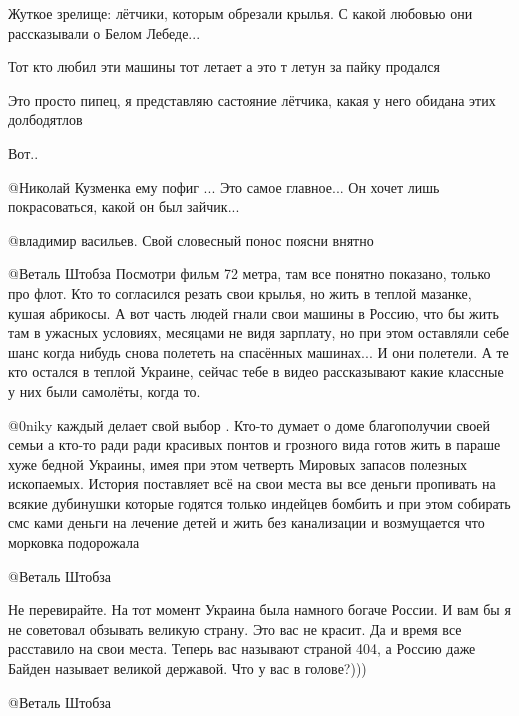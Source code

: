 \begin{itemize}
\begin{multicols}{2}

Жуткое зрелище: лётчики, которым обрезали крылья. С какой любовью они
рассказывали о Белом Лебеде...

\begin{itemize} %

Тот кто любил эти машины тот летает а это т летун за пайку продался


Это просто пипец, я представляю састояние лётчика, какая у него обидана этих долбодятлов

Вот..


@Николай Кузменка  ему пофиг ... Это самое главное... Он хочет лишь
покрасоваться, какой он был зайчик...

@владимир васильев. Свой словесный понос поясни внятно


@Веталь Штобза  Посмотри фильм 72 метра, там все понятно показано, только про
флот. Кто то согласился резать свои крылья, но жить в теплой мазанке, кушая
абрикосы. А вот часть людей гнали свои машины в Россию, что бы жить там в
ужасных условиях, месяцами не видя зарплату, но при этом оставляли себе шанс
когда нибудь снова полететь на спасённых машинах... И они полетели. А те кто
остался в теплой Украине, сейчас тебе в видео рассказывают какие классные у
них были самолёты, когда то.


@0niky   каждый делает свой выбор . Кто-то думает о доме благополучии своей
семьи а кто-то ради ради красивых понтов и грозного вида готов жить в параше
хуже бедной Украины, имея при этом четверть Мировых запасов полезных
ископаемых. История поставляет всё на свои места вы  все деньги пропивать на
всякие дубинушки которые годятся только индейцев бомбить и при этом собирать
смс ками деньги на лечение детей и жить без канализации и возмущается что
морковка подорожала

@Веталь Штобза  

Не перевирайте.  На тот момент Украина была намного богаче России.  И вам бы я
не советовал обзывать великую страну. Это вас не красит.  Да и время все
расставило на свои места.  Теперь вас называют страной 404, а Россию даже
Байден называет великой державой.  Что у вас в голове?)))

 @Веталь Штобза  


\end{itemize}
\end{multicols}
\end{itemize}
